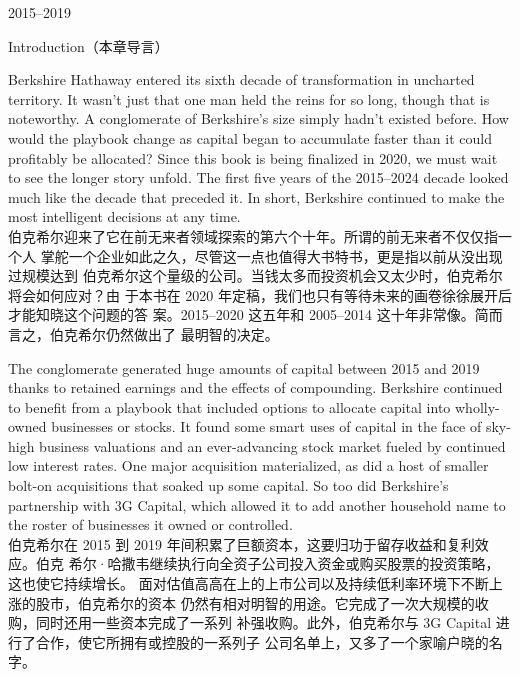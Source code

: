 \begin{chapter}{2015--2019}
\begin{section}{Introduction（本章导言）}
\begin{verseparallel}
  {
    Berkshire Hathaway entered its sixth decade of transformation in uncharted
    territory. It wasn't just that one man held the reins for so long, though
    that is noteworthy. A conglomerate of Berkshire's size simply hadn't
    existed before. How would the playbook change as capital began to accumulate
    faster than it could profitably be allocated? Since this book is being
    finalized in 2020, we must wait to see the longer story unfold. The first
    five years of the 2015–2024 decade looked much like the decade that preceded
    it. In short, Berkshire continued to make the most intelligent decisions at
    any time. \\
  }
  {
    伯克希尔迎来了它在前无来者领域探索的第六个十年。所谓的前无来者不仅仅指一个人
    掌舵一个企业如此之久，尽管这一点也值得大书特书，更是指以前从没出现过规模达到
    伯克希尔这个量级的公司。当钱太多而投资机会又太少时，伯克希尔将会如何应对？由
    于本书在 2020 年定稿，我们也只有等待未来的画卷徐徐展开后才能知晓这个问题的答
    案。2015--2020 这五年和 2005--2014 这十年非常像。简而言之，伯克希尔仍然做出了
    最明智的决定。
  }
\end{verseparallel}

\begin{verseparallel}
  {
    The conglomerate generated huge amounts of capital between 2015 and
    2019 thanks to retained earnings and the effects of compounding. Berkshire
    continued to benefit from a playbook that included options to allocate
    capital into wholly-owned businesses or stocks. It found some smart uses of
    capital in the face of sky-high business valuations and an ever-advancing
    stock market fueled by continued low interest rates. One major acquisition
    materialized, as did a host of smaller bolt-on acquisitions that soaked up
    some capital. So too did Berkshire's partnership with 3G Capital, which
    allowed it to add another household name to the roster of businesses it
    owned or controlled.\\
  }
  {
    伯克希尔在 2015 到 2019 年间积累了巨额资本，这要归功于留存收益和复利效应。伯克
    希尔·哈撒韦继续执行向全资子公司投入资金或购买股票的投资策略，这也使它持续增长。
    面对估值高高在上的上市公司以及持续低利率环境下不断上涨的股市，伯克希尔的资本
    仍然有相对明智的用途。它完成了一次大规模的收购，同时还用一些资本完成了一系列
    补强收购。此外，伯克希尔与 3G Capital 进行了合作，使它所拥有或控股的一系列子
    公司名单上，又多了一个家喻户晓的名字。
  }
\end{verseparallel}


\end{section}
\end{chapter}
